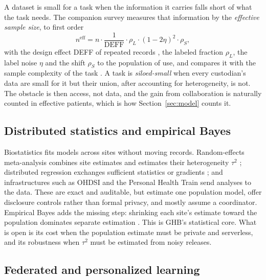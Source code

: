 \documentclass[acmsmall,screen,review]{acmart}
\newcommand{\eff}{\mathrm{eff}}
\theoremstyle{acmdefinition}
\begin{document}
A dataset is small for a task when the information it carries falls short of what the task needs. The companion survey \cite{simoes2026collectively} measures that information by the \emph{effective sample size}, to first order
\begin{equation}\label{eq:neff}
n^{\eff}=n\cdot\frac{1}{\mathrm{DEFF}}\cdot\rho_L\cdot(1-2\eta)^2\cdot\rho_S,
\end{equation}
with the design effect DEFF of repeated records \cite{kish1965survey}, the labeled fraction $\rho_L$, the label noise $\eta$ \cite{angluin1988learning} and the shift $\rho_S$ to the population of use, and compares it with the sample complexity of the task \cite{riley2019minimumsample}. A task is \emph{siloed-small} when every custodian's data are small for it but their union, after accounting for heterogeneity, is not. The obstacle is then access, not data, and the gain from collaboration is naturally counted in effective patients, which is how Section~\ref{sec:model} counts it.

\subsection{Distributed statistics and empirical Bayes}\label{sec:distributed}

Biostatistics fits models across sites without moving records. Random-effects meta-analysis combines site estimates and estimates their heterogeneity $\tau^2$ \cite{dersimonian1986meta}; distributed regression exchanges sufficient statistics or gradients \cite{duan2020learning,gaye2014datashield,jordan2019communication,wu2012grid}; and infrastructures such as OHDSI \cite{hripcsak2015observational} and the Personal Health Train \cite{beyan2020distributed,deist2020distributed} send analyses to the data. These are exact and auditable, but estimate one population model, offer disclosure controls rather than formal privacy, and mostly assume a coordinator. Empirical Bayes adds the missing step: shrinking each site's estimate toward the population dominates separate estimation \cite{efron1973steins,gelman2013bayesian,stein1956inadmissibility}. This is GHB's statistical core. What is open is its cost when the population estimate must be private and serverless, and its robustness when $\tau^2$ must be estimated from noisy releases.

\subsection{Federated and personalized learning}\label{sec:federated}
\end{document}
